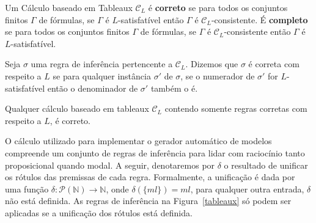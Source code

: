 \begin{definition}
    Um Cálculo baseado em Tableaux $\mathcal{C}_L$ é \textbf{correto} se para todos os
    conjuntos finitos $\Gamma$ de fórmulas, se $\Gamma$ é $L$-satisfatível então $\Gamma$ é
    $\mathcal{C}_L$-consistente. É \textbf{completo} se para todos os conjuntos
    finitos $\Gamma$ de fórmulas, se $\Gamma$ é $\mathcal{C}_L$-consistente então $\Gamma$ é
    $L$-satisfatível.
\end{definition}

\begin{definition}
    Seja $\sigma$ uma regra de inferência pertencente a $\mathcal{C}_L$. Dizemos
    que $\sigma$ é correta com respeito a $L$ se para qualquer instância $\sigma
    '$ de $\sigma$, se o numerador de $\sigma '$ for $L$-satisfatível então o
    denominador de $\sigma '$ também o é.
\end{definition}

Qualquer cálculo baseado em tableaux $\mathcal{C}_L$ contendo somente regras corretas com respeito a $L$, é
correto. 

O cálculo utilizado para implementar o gerador automático de modelos compreende
um conjunto de regras de inferência para lidar com raciocínio tanto
proposicional quando modal. A seguir, denotaremos por $\delta$ o
resultado de unificar os rótulos das premissas de cada regra. Formalmente,
a unificação é dada por uma função $\delta: \mathscr{P}(\mathbb{N})
\longrightarrow \mathbb{N}$, onde $\delta(\{ml\}) = ml$, para qualquer outra
entrada, $\delta$ não está definida. As regras de inferência na
Figura~\ref{tableaux} só podem ser aplicadas se a unificação dos rótulos está
definida\cite{DBLP:conf/tableaux/NalonHD15}.

